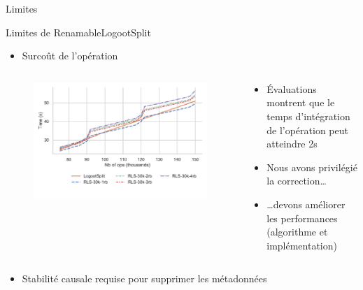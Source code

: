 \begin{frame}[fragile]{Limites}
  \begin{block}{Limites de RenamableLogootSplit}
    \begin{itemize}
      \item Surcoût de l'opération \ren
    \end{itemize}
    \pause
    \begin{columns}
      \begin{column}{0.6\textwidth}
        \begin{figure}[!ht]
            \includegraphics[width=\columnwidth]{img/replay-log-30k-2022-12-09}
        \end{figure}
      \end{column}
      \hspace{-2em}
      \begin{column}{0.6\textwidth}
        \pause
        \begin{itemize}
          \item Évaluations montrent que le \alert{temps d'intégration de l'opération \ren peut atteindre 2s}
          \item Nous avons \alert{privilégié la correction}\dots
          \item \dots devons \alert{améliorer les performances} (algorithme et implémentation)
        \end{itemize}
      \end{column}
    \end{columns}
    \pause
    \begin{itemize}
      \item Stabilité causale requise pour supprimer les métadonnées
    \end{itemize}
  \end{block}
\end{frame}

